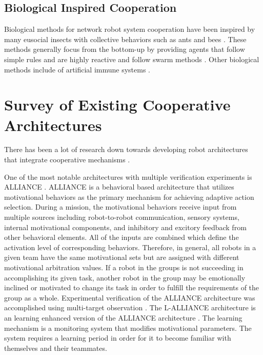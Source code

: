     \subsection{Biological Inspired Cooperation}

      Biological methods for network robot system cooperation have been
        inspired by many eusocial insects with collective behaviors such as
        ants and bees \cite{Cao1997}.
      These methods generally focus from the bottom-up by providing agents
        that follow simple rules and are highly reactive and follow swarm
         methods \cite{Parker2009,Dudek1993}.
      Other biological methods include of artificial immune systems \cite{Khan2008}.


  \section{Survey of Existing Cooperative Architectures}

    There has been a lot of research down towards developing robot 
      architectures that integrate cooperative mechanisms 
      \cite{Noreils1993,Fukuda1989,Asama1989,Beni1989,Parker1998,Parker1994,Caloud1990}.

    One of the most notable architectures with multiple verification experiments
      is ALLIANCE \cite{Parker1998,Parker1994}.
    ALLIANCE is a behavioral based architecture that utilizes motivational
      behaviors as the primary mechanism for achieving adaptive action 
      selection.
    During a mission, the motivational behaviors receive input from multiple
      sources including robot-to-robot communication, sensory systems,
      internal motivational components, and inhibitory and excitory feedback 
      from other behavioral elements.
    All of the inputs are combined which define the activation level of
      corresponding behaviors.
    Therefore, in general, all robots in a given team have the same motivational
      sets but are assigned with different motivational arbitration values.
    If a robot in the groups is not succeeding in accomplishing its given task,
      another robot in the group may be emotionally inclined or motivated
      to change its task in order to fulfill the requirements of the group
      as a whole.
    Experimental verification of the ALLIANCE architecture was accomplished 
      using multi-target observation \cite{Parker1999}.
    The L-ALLIANCE architecture is an learning enhanced version of the 
      ALLIANCE architecture \cite{Parker1996}.
    The learning mechanism is a monitoring system that modifies motivational
      parameters.
    The system requires a learning period in order for it to become familiar 
      with themselves and their teammates.

